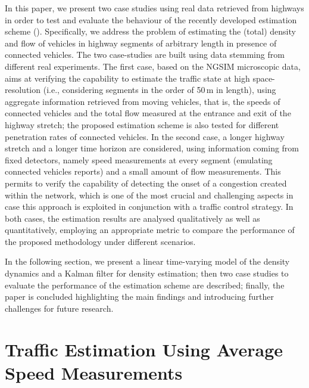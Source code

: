 \documentclass[titlepage,oneside,fleqn,12pt]{article}
\newcommand{\trbnum}[1]{{\it \citenum{#1}}}
\begin{document}
In this paper, we present two case studies using real data retrieved from highways in order to test and evaluate the behaviour of the recently developed estimation scheme (\trbnum{Bekiaris2015}).
Specifically, we address the problem of estimating the (total) density and flow of vehicles in highway segments of arbitrary length in presence of connected vehicles.
The two case-studies are built using data stemming from different real experiments. The first case, based on the NGSIM microscopic data, aims at verifying the capability to estimate the traffic state at high space-resolution (i.e., considering segments in the order of 50\,m in length), using aggregate information retrieved from moving vehicles, that is, the speeds of connected vehicles and the total flow measured at the entrance and exit of the highway stretch; the proposed estimation scheme is also tested for different penetration rates of connected vehicles. In the second case, a longer highway stretch and a longer time horizon are considered, using information coming from fixed detectors, namely speed measurements at every segment (emulating connected vehicles reports) and a small amount of flow measurements. This permits to verify the capability of detecting the onset of a congestion created within the network, which is one of the most crucial and challenging aspects in case this approach is exploited in conjunction with a traffic control strategy. In both cases, the estimation results are analysed qualitatively as well as quantitatively, employing an appropriate metric to compare the performance of the proposed methodology under different scenarios.

In the following section, we present a linear time-varying model of the density dynamics and a Kalman filter for density estimation; then two case studies to evaluate the performance of the estimation scheme are described; finally, the paper is concluded highlighting the main findings and introducing further challenges for future research.


\section{Traffic Estimation Using Average Speed Measurements} \label{sec:filter}
\end{document}
